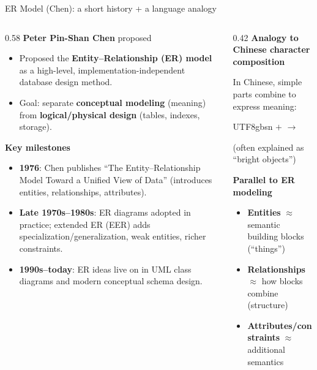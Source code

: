 \documentclass[10pt,aspectratio=169]{beamer}
\begin{document}
\begin{frame}{ER Model (Chen): a short history + a language analogy}
\begin{columns}[T,onlytextwidth]
\small
  \begin{column}{0.58\textwidth}
    \textbf{Peter Pin-Shan Chen} proposed 
    \begin{itemize}
      \item Proposed the \textbf{Entity–Relationship (ER) model} as a high-level, implementation-independent database design method.
      \item Goal: separate \textbf{conceptual modeling} (meaning) from \textbf{logical/physical design} (tables, indexes, storage).
    \end{itemize}

    \vspace{0.4em}
    \textbf{Key milestones}
    \begin{itemize}
      \item \textbf{1976}: Chen publishes ``The Entity--Relationship Model Toward a Unified View of Data'' (introduces entities, relationships, attributes).
      \item \textbf{Late 1970s--1980s}: ER diagrams adopted in practice; extended ER (EER) adds specialization/generalization, weak entities, richer constraints.
      \item \textbf{1990s--today}: ER ideas live on in UML class diagrams and modern conceptual schema design.
    \end{itemize}
  \end{column}

  \begin{column}{0.42\textwidth}
    \textbf{Analogy to Chinese character composition}
    \vspace{0.3em}

    In Chinese, simple parts combine to express meaning:\\
\begin{CJK}{UTF8}{gbsn} %
       $+$   $\rightarrow$ 
\end{CJK}
    
    (often explained as ``bright objects'') 

    \vspace{0.6em}
    \textbf{Parallel to ER modeling}
    \begin{itemize}
      \item \textbf{Entities} $\approx$ semantic building blocks (``things'')
      \item \textbf{Relationships} $\approx$ how blocks combine (structure)
      \item \textbf{Attributes/constraints} $\approx$ additional semantics
    \end{itemize}
    \vspace{0.4em}
  \end{column}
\end{columns}
\end{frame}
\end{document}
